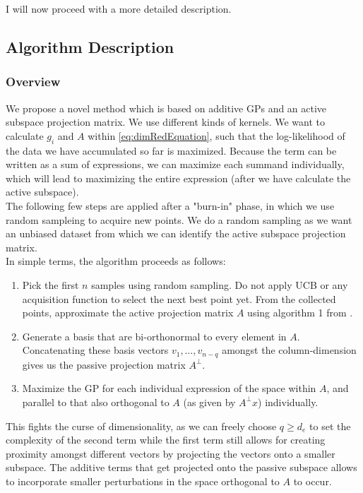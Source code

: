 I will now proceed with a more detailed description.

\subsection{Algorithm Description}

\subsubsection{Overview}

We propose a novel method which is based on additive GPs and an active subspace projection matrix.
We use different kinds of kernels.
We want to calculate $g_i$ and $A$ within \ref{eq:dimRedEquation}, such that the log-likelihood of the data we have accumulated so far is maximized.
 Because the term can be written as a sum of expressions, we can maximize each summand individually, which will lead to maximizing the entire expression (after we have calculate the active subspace). \\
 
 The following few steps are applied after a "burn-in" phase, in which we use random sampleing to acquire new points.
 We do a random sampling as we want an unbiased dataset from which we can identify the active subspace projection matrix. \\
 
 In simple terms, the algorithm proceeds as follows:
 
 \begin{enumerate}
 \item Pick the first $n$ samples using random sampling.
 Do not apply UCB or any acquisition function to select the next best point yet.
 From the collected points, approximate the active projection matrix $A$ using algorithm 1 from \citep{Tripathy}.
 \item Generate a basis that are bi-orthonormal to every element in $A$.
 Concatenating these basis vectors $v_1, \ldots, v_{n-{q}}$ amongst the column-dimension gives us the passive projection matrix $A^\bot$.
 \item Maximize the GP for each individual expression of the space within $A$, and parallel to that also orthogonal to $A$ (as given by $A^\bot x$) individually. 
 \end{enumerate}
 
 This fights the curse of dimensionality, as we can freely choose $q \geq d_e$ to set the complexity of the second term while the first term still allows for creating proximity amongst different vectors by projecting the vectors onto a smaller subspace.
 The additive terms that get projected onto the passive subspace allows to incorporate smaller perturbations in the space orthogonal to $A$ to occur.

